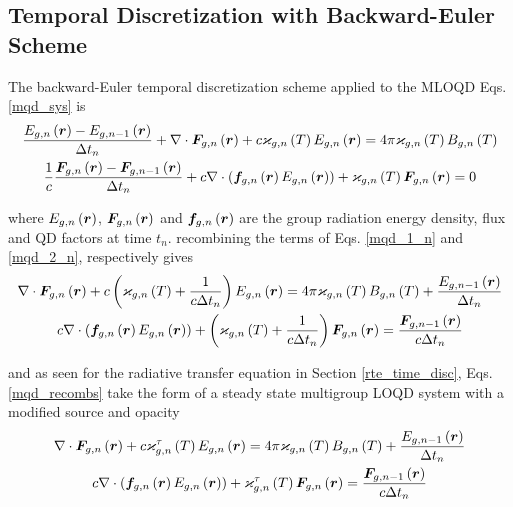 \iffalse
\subsection{Temporal Discretization with Backward-Euler Scheme}
	The backward-Euler temporal discretization scheme applied to the MLOQD Eqs. \eqref{mqd_sys} is
	\begin{subequations}
		\begin{gather}
			\frac{E_{g,n}\left(\bm{r}\right) - E_{g,n-1}\left(\bm{r}\right)}{\Delta t_n} + \nabla\cdot\bm{F}_{g,n}\left(\bm{r}\right) + c\varkappa_{g,n}\left( T\right)E_{g,n}\left(\bm{r}\right) = 4\pi\varkappa_{g,n}\left( T\right)B_{g,n}\left( T\right) \label{mqd_1_n}\\
			\frac{1}{c}\frac{\bm{F}_{g,n}\left(\bm{r}\right) - \bm{F}_{g,n-1}\left(\bm{r}\right)}{\Delta t_n} + c\nabla\cdot\left(\bm{f}_{g,n}\left(\bm{r}\right)E_{g,n}\left(\bm{r}\right)\right) + \varkappa_{g,n}\left( T\right)\bm{F}_{g,n}\left(\bm{r}\right) = 0 \label{mqd_2_n}
		\end{gather}
	\end{subequations}
	
	where $E_{g,n}\left(\bm{r}\right)$, $\bm{F}_{g,n}\left(\bm{r}\right)$ and $\bm{f}_{g,n}\left(\bm{r}\right)$ are the group radiation energy density, flux and QD factors at time $t_n$.	recombining the terms of Eqs. \eqref{mqd_1_n} and \eqref{mqd_2_n}, respectively gives
	\begin{subequations}
		\begin{gather}
			\nabla\cdot\bm{F}_{g,n}\left(\bm{r}\right) + c\left(\varkappa_{g,n}\left( T\right) + \frac{1}{c\Delta t_n}\right)E_{g,n}\left(\bm{r}\right) = 4\pi\varkappa_{g,n}\left( T\right)B_{g,n}\left( T\right) + \frac{E_{g,n-1}\left(\bm{r}\right)}{\Delta t_n}  \label{mqd_1_recomb}\\
			c\nabla\cdot\left(\bm{f}_{g,n}\left(\bm{r}\right)E_{g,n}\left(\bm{r}\right)\right) + \left(\varkappa_{g,n}\left( T\right) + \frac{1}{c\Delta t_n}\right)\bm{F}_{g,n}\left(\bm{r}\right) = \frac{\bm{F}_{g,n-1}\left(\bm{r}\right)}{c\Delta t_n} \label{mqd_2_recomb}
		\end{gather}
		\label{mqd_recombs}
	\end{subequations}
	
	and as seen for the radiative transfer equation in Section \ref{rte_time_disc}, Eqs. \eqref{mqd_recombs} take the form of a steady state multigroup LOQD system with a modified source and opacity
	\begin{subequations}
		\begin{gather}
			\nabla\cdot\bm{F}_{g,n}\left(\bm{r}\right) + c\varkappa_{g,n}^\tau\left( T\right)E_{g,n}\left(\bm{r}\right) = 4\pi\varkappa_{g,n}\left( T\right)B_{g,n}\left( T\right) + \frac{E_{g,n-1}\left(\bm{r}\right)}{\Delta t_n}  \label{mqd_1_mod}\\
			c\nabla\cdot\left(\bm{f}_{g,n}\left(\bm{r}\right)E_{g,n}\left(\bm{r}\right)\right) + \varkappa_{g,n}^\tau\left( T\right)\bm{F}_{g,n}\left(\bm{r}\right) = \frac{\bm{F}_{g,n-1}\left(\bm{r}\right)}{c\Delta t_n} \label{mqd_2_mod}
		\end{gather}
		\label{mqd_mods}
	\end{subequations}
	
